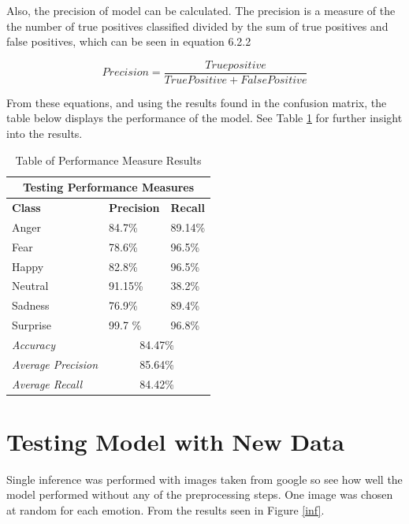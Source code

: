 Also, the precision of model can be calculated. The precision is a measure of the the number of true positives classified divided by the sum of true positives and false positives, which can be seen in equation 6.2.2

\begin{equation}\label{eq:recall}
Precision = 
\frac{
	True positive
}{
	True Positive + False Positive
}
\end{equation}

From these equations, and using the results found in the confusion matrix, the table below displays the performance of the model. See 
Table \ref{table:per} for further insight into the results.

\begin{table}[ht]
	\begin{center}
	\begin{tabular}{|p{5cm}||p{2cm}||p{2cm}|}		
		\hline
		
		\multicolumn{3}{|c|}{Testing Performance Measures} \\
		\hline
		\textbf{Class}& \textbf{Precision} &  \textbf{Recall}\\
		\hline
		Anger  & 84.7\% & 89.14\%	\\
		\hline
		Fear  & 78.6\% & 96.5\%	\\
		\hline
		Happy  & 82.8\% & 96.5\%  \\
		\hline
		Neutral & 91.15\% & 38.2\%	\\
		\hline	
		Sadness &  76.9\% & 89.4\%	\\
		\hline
		Surprise & 99.7 \% & 96.8\%	\\
		\hline	
		\hline 
		\textit{Accuracy} & \multicolumn{2}{|c|}{ 84.47\%} \\
		\hline
		\textit{Average Precision} & \multicolumn{2}{|c|}{ 85.64\%} \\
		\hline
		\textit{Average Recall} & \multicolumn{2}{|c|}{ 84.42\%} \\
		\hline
	\end{tabular}
	\caption{Table of Performance Measure Results}
	\label{table:per}
	\end{center}
\end{table}
	
\section{Testing Model with New Data}
Single inference was performed with images taken from google so see how well the model performed without any of the preprocessing steps. One image was chosen at random for each emotion. From the results seen in Figure \ref{inf}.

